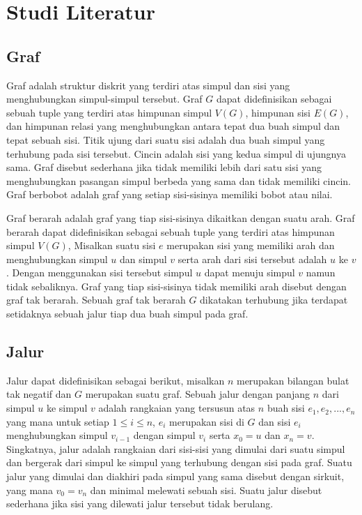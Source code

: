 \chapter{Studi Literatur}

\section{Graf}

Graf adalah struktur diskrit yang terdiri atas simpul dan sisi yang menghubungkan simpul-simpul tersebut. Graf $G$ dapat didefinisikan sebagai sebuah tuple yang 
terdiri atas himpunan simpul $V(G)$, himpunan sisi $E(G)$, dan himpunan relasi yang menghubungkan antara tepat dua buah simpul dan tepat sebuah sisi. Titik ujung dari suatu sisi 
adalah dua buah simpul yang terhubung pada sisi tersebut. Cincin adalah sisi yang kedua simpul di ujungnya sama. Graf disebut sederhana jika tidak memiliki lebih 
dari satu sisi yang menghubungkan pasangan simpul berbeda yang sama dan tidak memiliki cincin. Graf berbobot adalah graf yang setiap sisi-sisinya memiliki bobot atau nilai.

Graf berarah adalah graf yang tiap sisi-sisinya dikaitkan dengan suatu arah. Graf berarah dapat didefinisikan sebagai sebuah tuple yang terdiri atas 
himpunan simpul $V(G)$, Misalkan suatu sisi $e$ merupakan sisi yang memiliki arah dan menghubungkan simpul $u$ dan simpul $v$ serta arah dari sisi tersebut 
adalah $u$ ke $v$. Dengan menggunakan sisi tersebut simpul $u$ dapat menuju simpul $v$ namun tidak sebaliknya. Graf yang tiap sisi-sisinya tidak memiliki 
arah disebut dengan graf tak berarah. Sebuah graf tak berarah $G$ dikatakan terhubung jika terdapat setidaknya sebuah jalur tiap dua buah simpul pada graf.


\section{Jalur}

Jalur dapat didefinisikan sebagai berikut, misalkan $n$ merupakan bilangan bulat tak negatif dan $G$ merupakan suatu graf. Sebuah jalur dengan 
panjang $n$ dari simpul $u$ ke simpul $v$ adalah rangkaian yang tersusun atas $n$ buah sisi $e_{1}, e_{2}, ..., e_{n}$ yang mana untuk setiap $1 \leq i \leq n$, $e_{i}$ merupakan sisi 
di $G$ dan sisi $e_{i}$ menghubungkan simpul $v_{i-1}$ dengan simpul $v_{i}$ serta $x_{0} = u$ dan $x_{n} = v$. Singkatnya, jalur adalah rangkaian dari sisi-sisi yang dimulai dari 
suatu simpul dan bergerak dari simpul ke simpul yang terhubung dengan sisi pada graf. Suatu jalur yang dimulai dan diakhiri pada simpul yang sama disebut 
dengan sirkuit, yang mana $v_{0} = v_{n}$ dan minimal melewati sebuah sisi. Suatu jalur disebut sederhana jika sisi yang dilewati jalur tersebut tidak berulang.

